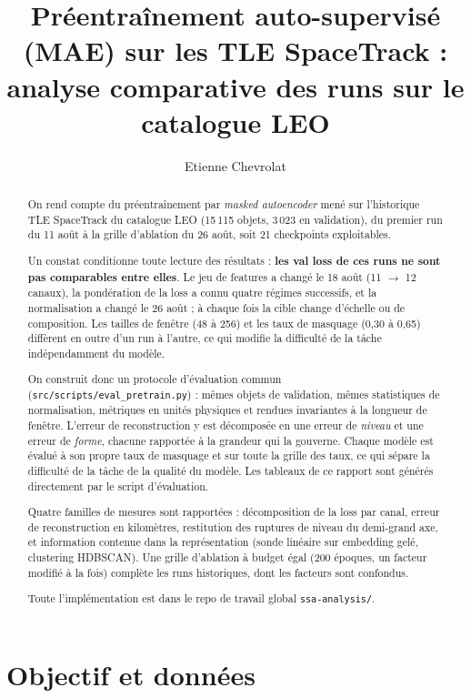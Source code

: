 \documentclass{article}
\title{Préentraînement auto-supervisé (MAE) sur les TLE SpaceTrack : \\ analyse comparative des runs sur le catalogue LEO}
\author{Etienne Chevrolat}
\date{}
\begin{document}
\maketitle

\begin{abstract}
On rend compte du préentraînement par \textit{masked autoencoder} mené sur l'historique TLE SpaceTrack du catalogue LEO (15\,115 objets, 3\,023 en validation), du premier run du 11 août à la grille d'ablation du 26 août, soit 21 checkpoints exploitables.

Un constat conditionne toute lecture des résultats : \textbf{les val loss de ces runs ne sont pas comparables entre elles}. Le jeu de features a changé le 18 août (11 $\to$ 12 canaux), la pondération de la loss a connu quatre régimes successifs, et la normalisation a changé le 26 août ; à chaque fois la cible change d'échelle ou de composition. Les tailles de fenêtre (48 à 256) et les taux de masquage (0,30 à 0,65) diffèrent en outre d'un run à l'autre, ce qui modifie la difficulté de la tâche indépendamment du modèle.

On construit donc un protocole d'évaluation commun (\texttt{src/scripts/eval\_pretrain.py}) : mêmes objets de validation, mêmes statistiques de normalisation, métriques en unités physiques et rendues invariantes à la longueur de fenêtre. L'erreur de reconstruction y est décomposée en une erreur de \emph{niveau} et une erreur de \emph{forme}, chacune rapportée à la grandeur qui la gouverne. Chaque modèle est évalué à son propre taux de masquage et sur toute la grille des taux, ce qui sépare la difficulté de la tâche de la qualité du modèle. Les tableaux de ce rapport sont générés directement par le script d'évaluation.

Quatre familles de mesures sont rapportées : décomposition de la loss par canal, erreur de reconstruction en kilomètres, restitution des ruptures de niveau du demi-grand axe, et information contenue dans la représentation (sonde linéaire sur embedding gelé, clustering HDBSCAN). Une grille d'ablation à budget égal (200 époques, un facteur modifié à la fois) complète les runs historiques, dont les facteurs sont confondus.

Toute l'implémentation est dans le repo de travail global \texttt{ssa-analysis/}.
\end{abstract}

\section{Objectif et données}
\end{document}
